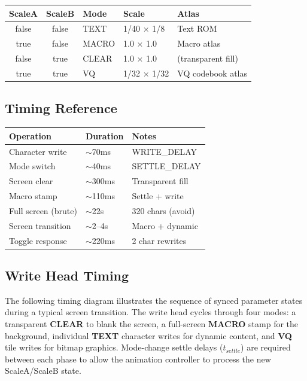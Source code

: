 \documentclass[10pt]{article}
\begin{document}
\begin{center}
{\small
\begin{tabular}{cclll}
  \toprule
  \textbf{ScaleA} & \textbf{ScaleB} & \textbf{Mode} & \textbf{Scale} & \textbf{Atlas} \\
  \midrule
  false & false & TEXT & 1/40 $\times$ 1/8 & Text ROM \\
  true & false & MACRO & 1.0 $\times$ 1.0 & Macro atlas \\
  false & true & CLEAR & 1.0 $\times$ 1.0 & (transparent fill) \\
  true & true & VQ & 1/32 $\times$ 1/32 & VQ codebook atlas \\
  \bottomrule
\end{tabular}
}
\end{center}

\subsection{Timing Reference}

\begin{center}
{\small
\begin{tabular}{lll}
  \toprule
  \textbf{Operation} & \textbf{Duration} & \textbf{Notes} \\
  \midrule
  Character write & $\sim$70ms & WRITE\_DELAY \\
  Mode switch & $\sim$40ms & SETTLE\_DELAY \\
  Screen clear & $\sim$300ms & Transparent fill \\
  Macro stamp & $\sim$110ms & Settle + write \\
  Full screen (brute) & $\sim$22s & 320 chars (avoid) \\
  Screen transition & $\sim$2--4s & Macro + dynamic \\
  Toggle response & $\sim$220ms & 2 char rewrites \\
  \bottomrule
\end{tabular}
}
\end{center}

\newpage
\subsection{Write Head Timing}

The following timing diagram illustrates the sequence of synced parameter states during a typical screen transition. The write head cycles through four modes: a transparent \textbf{CLEAR} to blank the screen, a full-screen \textbf{MACRO} stamp for the background, individual \textbf{TEXT} character writes for dynamic content, and \textbf{VQ} tile writes for bitmap graphics. Mode-change settle delays ($t_{settle}$) are required between each phase to allow the animation controller to process the new ScaleA/ScaleB state.
\end{document}
